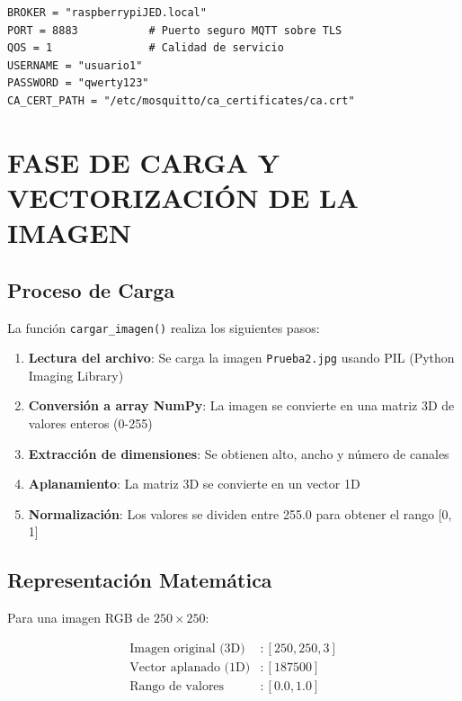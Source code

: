 \documentclass[12pt,a4paper]{article}
\begin{document}
\begin{lstlisting}
BROKER = "raspberrypiJED.local"
PORT = 8883           # Puerto seguro MQTT sobre TLS
QOS = 1               # Calidad de servicio
USERNAME = "usuario1"
PASSWORD = "qwerty123"
CA_CERT_PATH = "/etc/mosquitto/ca_certificates/ca.crt"
\end{lstlisting}

\section{FASE DE CARGA Y VECTORIZACIÓN DE LA IMAGEN}

\subsection{Proceso de Carga}

La función \texttt{cargar\_imagen()} realiza los siguientes pasos:

\begin{enumerate}
    \item \textbf{Lectura del archivo}: Se carga la imagen \texttt{Prueba2.jpg} usando PIL (Python Imaging Library)
    \item \textbf{Conversión a array NumPy}: La imagen se convierte en una matriz 3D de valores enteros (0-255)
    \item \textbf{Extracción de dimensiones}: Se obtienen alto, ancho y número de canales
    \item \textbf{Aplanamiento}: La matriz 3D se convierte en un vector 1D
    \item \textbf{Normalización}: Los valores se dividen entre 255.0 para obtener el rango [0, 1]
\end{enumerate}

\subsection{Representación Matemática}

Para una imagen RGB de $250 \times 250$:

\begin{equation}
\begin{aligned}
\text{Imagen original (3D)} &: [250, 250, 3] \\
\text{Vector aplanado (1D)} &: [187500] \\
\text{Rango de valores} &: [0.0, 1.0]
\end{aligned}
\end{equation}
\end{document}
